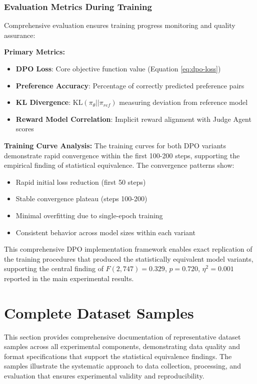 \subsubsection{Evaluation Metrics During Training}

Comprehensive evaluation ensures training progress monitoring and quality assurance:

\textbf{Primary Metrics:}
\begin{itemize}
    \item \textbf{DPO Loss}: Core objective function value (Equation \ref{eq:dpo-loss})
    \item \textbf{Preference Accuracy}: Percentage of correctly predicted preference pairs
    \item \textbf{KL Divergence}: $\text{KL}(\pi_\theta || \pi_{ref})$ measuring deviation from reference model
    \item \textbf{Reward Model Correlation}: Implicit reward alignment with Judge Agent scores
\end{itemize}

\textbf{Training Curve Analysis:}
The training curves for both DPO variants demonstrate rapid convergence within the first 100-200 steps, supporting the empirical finding of statistical equivalence. The convergence patterns show:

\begin{itemize}
    \item Rapid initial loss reduction (first 50 steps)
    \item Stable convergence plateau (steps 100-200)
    \item Minimal overfitting due to single-epoch training
    \item Consistent behavior across model sizes within each variant
\end{itemize}

This comprehensive DPO implementation framework enables exact replication of the training procedures that produced the statistically equivalent model variants, supporting the central finding of $F(2,747) = 0.329$, $p = 0.720$, $\eta^2 = 0.001$ reported in the main experimental results.

\section{Complete Dataset Samples}
\label{sec:complete-dataset-samples}

This section provides comprehensive documentation of representative dataset samples across all experimental components, demonstrating data quality and format specifications that support the statistical equivalence findings. The samples illustrate the systematic approach to data collection, processing, and evaluation that ensures experimental validity and reproducibility.

